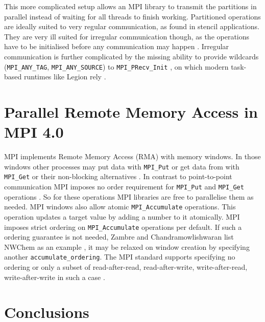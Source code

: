 \documentclass[sigconf]{acmart}
\begin{document}
This more complicated setup allows an MPI library to transmit the partitions in parallel instead of waiting for all threads to finish working.
Partitioned operations are ideally suited to very regular communication, as found in stencil applications.
They are very ill suited for irregular communication though, as the operations have to be initialised before any communication may happen \cite{zambreLessonsLearned2022}.
Irregular communication is further complicated by the missing ability to provide wildcards (\verb|MPI_ANY_TAG|, \verb|MPI_ANY_SOURCE|) to \verb|MPI_PRecv_Init| \cite{mpi40}, on which modern task-based runtimes like Legion rely \cite{zambreLessonsLearned2022}.


\section{Parallel Remote Memory Access in MPI 4.0}

MPI implements Remote Memory Access (RMA) with memory windows.
In those windows other processes may put data with \verb|MPI_Put| or get data from with \verb|MPI_Get| or their non-blocking alternatives \cite{mpi40}.
In contrast to point-to-point communication MPI imposes no order requirement for \verb|MPI_Put| and \verb|MPI_Get| operations \cite{mpi40}.
So for these operations MPI libraries are free to parallelise them as needed.
MPI windows also allow atomic \verb|MPI_Accumulate| operations.
This operation updates a target value by adding a number to it atomically.
MPI imposes strict ordering on \verb|MPI_Accumulate| operations per default.
If such a ordering guarantee is not needed, Zambre and Chandramowlishwaran list NWChem as an example \cite{zambreLessonsLearned2022}, it may be relaxed on window creation by specifying another \verb|accumulate_ordering|.
The MPI standard supports specifying no ordering or only a subset of read-after-read, read-after-write, write-after-read, write-after-write in such a case \cite{mpi40}.

\section{Conclusions}


\end{document}
